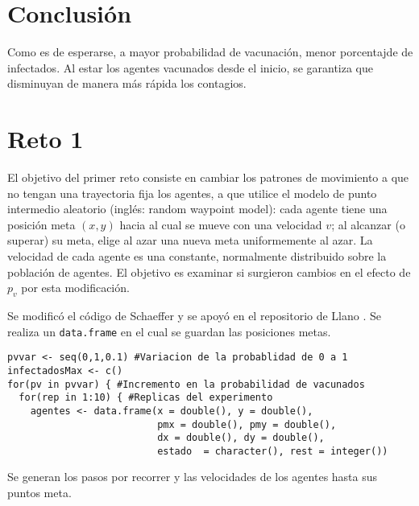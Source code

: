 \documentclass[12pt]{amsart}
\begin{document}
\section{Conclusión}
Como es de esperarse, a mayor probabilidad de vacunación, menor porcentajde de infectados. Al estar los agentes vacunados desde el inicio, se garantiza que disminuyan de manera más rápida los contagios.

\section{Reto 1}
El objetivo del primer reto consiste en cambiar los patrones de movimiento a que no tengan una trayectoria fija los agentes, a que utilice el modelo de punto intermedio aleatorio (inglés: random waypoint model): cada agente tiene una posición meta $(x, y)$ hacia al cual se mueve con una velocidad $v$; al alcanzar (o superar) su meta, elige al azar una nueva meta uniformemente al azar. La velocidad de cada agente es una constante, normalmente distribuido sobre la población de agentes. El objetivo es examinar si surgieron cambios en el efecto de $p_v$ por esta modificación.

Se modificó el código de Schaeffer \cite{codigo} y se apoyó en el repositorio de Llano \cite{llano}. Se realiza un \texttt{data.frame} en el cual se guardan las posiciones metas.
\renewcommand{\listingscaption}{Código}
\begin{listing}[H]
  \begin{verbatim}
pvvar <- seq(0,1,0.1) #Variacion de la probablidad de 0 a 1 
infectadosMax <- c()
for(pv in pvvar) { #Incremento en la probabilidad de vacunados
  for(rep in 1:10) { #Replicas del experimento 
    agentes <- data.frame(x = double(), y = double(), 
                          pmx = double(), pmy = double(), 
                          dx = double(), dy = double(),  
                          estado  = character(), rest = integer())
  \end{verbatim}
  \label{codigo4}
\end{listing}

Se generan los pasos por recorrer y las velocidades de los agentes hasta sus puntos meta.
\end{document}

